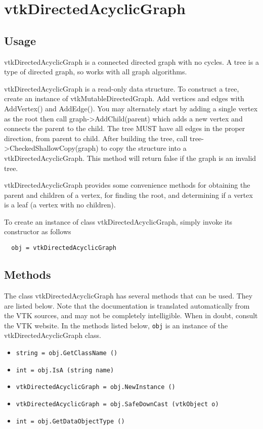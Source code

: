 \section{vtkDirectedAcyclicGraph}

\subsection{Usage}

 vtkDirectedAcyclicGraph is a connected directed graph with no cycles. A tree is a type of
 directed graph, so works with all graph algorithms.

 vtkDirectedAcyclicGraph is a read-only data structure.
 To construct a tree, create an instance of vtkMutableDirectedGraph.
 Add vertices and edges with AddVertex() and AddEdge(). You may alternately
 start by adding a single vertex as the root then call graph->AddChild(parent)
 which adds a new vertex and connects the parent to the child.
 The tree MUST have all edges in the proper direction, from parent to child.
 After building the tree, call tree->CheckedShallowCopy(graph) to copy the
 structure into a vtkDirectedAcyclicGraph. This method will return false if the graph is
 an invalid tree.

 vtkDirectedAcyclicGraph provides some convenience methods for obtaining the parent and
 children of a vertex, for finding the root, and determining if a vertex
 is a leaf (a vertex with no children).


To create an instance of class vtkDirectedAcyclicGraph, simply
invoke its constructor as follows
\begin{verbatim}
  obj = vtkDirectedAcyclicGraph
\end{verbatim}
\subsection{Methods}

The class vtkDirectedAcyclicGraph has several methods that can be used.
  They are listed below.
Note that the documentation is translated automatically from the VTK sources,
and may not be completely intelligible.  When in doubt, consult the VTK website.
In the methods listed below, \verb|obj| is an instance of the vtkDirectedAcyclicGraph class.
\begin{itemize}
\item  \verb|string = obj.GetClassName ()|

\item  \verb|int = obj.IsA (string name)|

\item  \verb|vtkDirectedAcyclicGraph = obj.NewInstance ()|

\item  \verb|vtkDirectedAcyclicGraph = obj.SafeDownCast (vtkObject o)|

\item  \verb|int = obj.GetDataObjectType ()|

\end{itemize}
